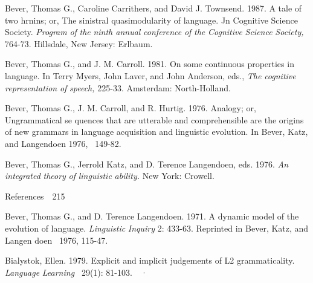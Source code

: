 \begin{styleStandard}
Bever, Thomas G., Caroline Carrithers, and David J. Townsend. 1987. A tale of two hrnins; or, The sinistral quasimodularity of language. Jn Cognitive Science Society. \textit{Program}\textit{ }\textit{of}\textit{ }\textit{the}\textit{ }\textit{ninth annual}\textit{ }\textit{conference}\textit{ }\textit{of}\textit{ }\textit{the}\textit{ }\textit{Cognitive}\textit{ }\textit{Science}\textit{ }\textit{Society,}\textit{ }764-73. Hillsdale, New Jersey: Erlbaum.
\end{styleStandard}


\begin{styleStandard}
Bever, Thomas G., and J. M. Carroll. 1981. On some continuous properties in language. In Terry Myers, John Laver, and John Anderson, eds., \textit{The}\textit{ }\textit{cognitive}\textit{ }\textit{representation}\textit{ }\textit{of}\textit{ }\textit{speech,}\textit{ }225-33. Amsterdam: North-Holland.
\end{styleStandard}


\begin{styleStandard}
Bever, Thomas G., J. M. Carroll, and R. Hurtig. 1976. Analogy; or, Ungrammatical se\- quences that are utterable and comprehensible are the origins of new grammars in language acquisition and linguistic evolution. In Bever, Katz, and Langendoen 1976, \ 149-82.
\end{styleStandard}


\begin{styleStandard}
Bever, Thomas G., Jerrold Katz, and D. Terence Langendoen, eds. 1976. \textit{An}\textit{ }\textit{integrated}\textit{ }\textit{theory}\textit{ }\textit{of}\textit{ }\textit{linguistic}\textit{ }\textit{ability.}\textit{ }New York: Crowell.
\end{styleStandard}


\clearpage\setcounter{page}{1}\begin{styleStandard}
References\ \ 215
\end{styleStandard}


\begin{styleStandard}
Bever, Thomas G., and D. Terence Langendoen. 1971. A dynamic model of the evolution of language. \textit{Linguistic}\textit{ }\textit{Inquiry}\textit{ }2: 433-63. Reprinted in Bever, Katz, and Langen\- doen \ 1976, 115-47.
\end{styleStandard}


\begin{styleStandard}
Bialystok, Ellen. 1979. Explicit and implicit judgements of L2 grammaticality. \textit{Language}\textit{ }\textit{Learning }\textit{\ }29(1): 81-103.\ \ ·
\end{styleStandard}


